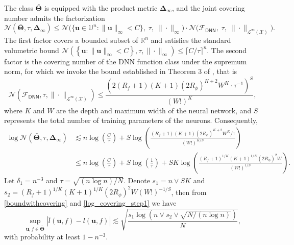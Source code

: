 \documentclass[
  12pt]{article}
\begin{document}
\noindent The class $\bar{\boldsymbol{\Theta}}$ is equipped with the product metric $\mathbf{\Delta}_\infty$, and the joint covering number admits the factorization
$$\mathcal{N}(\bar{\boldsymbol{\Theta}}, \tau, \mathbf{\Delta}_\infty) \leq \mathcal{N}\bigl(\{\boldsymbol{u} \in \mathbb{U}^n : \|\boldsymbol{u}\|_\infty < C\},\; \tau,\; \|\cdot\|_\infty\bigr) \cdot \mathcal{N}\bigl(\mathcal{F}_{\mathsf{DNN}},\; \tau,\; \|\cdot\|_{\mathcal{L}^\infty(\mathcal{X})}\bigr). $$
The first factor covers a bounded subset of $\mathbb{R}^n$ and satisfies the standard volumetric bound $\mathcal{N}\left(\left\{\boldsymbol{u}:\|\boldsymbol{u}\|_{\infty}<C\right\}, \tau,\|\cdot\|_{\infty}\right) \leq\lceil C / \tau\rceil^n$. The second factor is the covering number of the DNN function class under the supremum norm, for which we invoke the bound established in Theorem 3 of \cite{shen2024exploringcomplexitydeepneural}, that is
$$\mathcal{N}\left(\mathcal{F}_{\mathsf{DNN}},\tau,  \|\cdot\|_{\mathcal{L}^{\infty}(\mathcal{X})}\right) \leq\frac{\left(2(R_f+1)(K+1)(2R_{\phi})^{K+2} W^K \cdot \tau^{-1}\right)^S}{(W!)^K},$$ 
\noindent where $K$ and $W$ are the depth and maximum width of the neural network, and $S$ represents the total number of training parameters of the neurons. Consequently,
{\small\begin{align}
    \log \mathcal{N}\left(\bar{\boldsymbol{\Theta}},\tau, \mathbf{\Delta}_\infty \right) &\lesssim n \log \left(\frac{C}{\tau}\right)+S \log \left(\frac{(R_f+1)(K+1)(2R_{\phi})^{K+2} W^K / \tau}{(W!)^{K / S}}\right) \nonumber\\
    &\leq n \log \left(\frac{C}{\tau}\right)+S \log\left( \frac{1}{\tau}\right)+SK \log \left(\frac{(R_f+1)^{1/K}(K+1)^{1/K}(2R_{\phi})^{2} W}{(W!)^{1 / S}} \right). \label{log_covering_step1}
    \end{align}}
\noindent  Let $\delta_1 = n^{-3}$ and $\tau = \sqrt{(n \log n) / N}$. Denote $s_1 = n \vee SK$ and $s_2=(R_f+1)^{1/K}(K+1)^{1/K}(2R_{\phi})^{2} W(W!)^{-1/S}$, then from \eqref{boundwithcovering} and \eqref{log_covering_step1} we have
\begin{equation}\label{consitency_sup0}
\sup _{\boldsymbol{u},f \in \bar{\boldsymbol{\Theta}}}\left|\bar{l}(\boldsymbol{u},f)-l(\boldsymbol{u},f)\right| \lesssim  \sqrt{\frac{s_1\log (n\vee s_2 \vee\sqrt{N/(n \log n)})}{N}},
\end{equation}
with probability at least $1-n^{-3}$.
\end{document}
